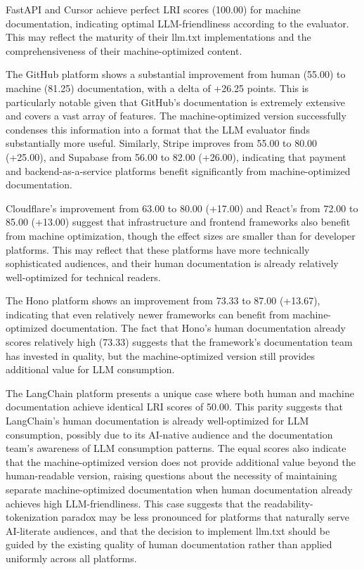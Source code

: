 \documentclass[10pt,conference,a4paper]{IEEEtran}
\begin{document}
FastAPI and Cursor achieve perfect LRI scores (100.00) for machine documentation, indicating optimal LLM-friendliness according to the evaluator. This may reflect the maturity of their llm.txt implementations and the comprehensiveness of their machine-optimized content.

The GitHub platform shows a substantial improvement from human (55.00) to machine (81.25) documentation, with a delta of +26.25 points. This is particularly notable given that GitHub's documentation is extremely extensive and covers a vast array of features. The machine-optimized version successfully condenses this information into a format that the LLM evaluator finds substantially more useful. Similarly, Stripe improves from 55.00 to 80.00 (+25.00), and Supabase from 56.00 to 82.00 (+26.00), indicating that payment and backend-as-a-service platforms benefit significantly from machine-optimized documentation.

Cloudflare's improvement from 63.00 to 80.00 (+17.00) and React's from 72.00 to 85.00 (+13.00) suggest that infrastructure and frontend frameworks also benefit from machine optimization, though the effect sizes are smaller than for developer platforms. This may reflect that these platforms have more technically sophisticated audiences, and their human documentation is already relatively well-optimized for technical readers.

The Hono platform shows an improvement from 73.33 to 87.00 (+13.67), indicating that even relatively newer frameworks can benefit from machine-optimized documentation. The fact that Hono's human documentation already scores relatively high (73.33) suggests that the framework's documentation team has invested in quality, but the machine-optimized version still provides additional value for LLM consumption.

The LangChain platform presents a unique case where both human and machine documentation achieve identical LRI scores of 50.00. This parity suggests that LangChain's human documentation is already well-optimized for LLM consumption, possibly due to its AI-native audience and the documentation team's awareness of LLM consumption patterns. The equal scores also indicate that the machine-optimized version does not provide additional value beyond the human-readable version, raising questions about the necessity of maintaining separate machine-optimized documentation when human documentation already achieves high LLM-friendliness. This case suggests that the readability-tokenization paradox may be less pronounced for platforms that naturally serve AI-literate audiences, and that the decision to implement llm.txt should be guided by the existing quality of human documentation rather than applied uniformly across all platforms.
\end{document}
